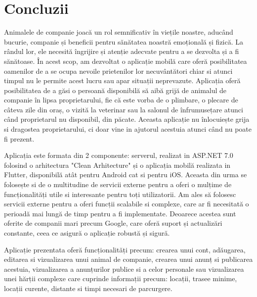 \chapter*{Concluzii} 

Animalele de companie joacă un rol semnificativ în viețile noastre, aducând bucurie, companie și beneficii pentru sănătatea noastră emoțională și fizică. La rândul lor, ele necesită îngrijire și atenție adecvate pentru a se dezvolta și a fi sănătoase. În acest scop, am dezvoltat o aplicație mobilă care oferă posibilitatea oamenilor de a se ocupa nevoile prietenilor lor necuvântători chiar si atunci timpul nu le permite acest lucru sau apar situații neprevazute. Aplicația oferă posibilitatea de a găsi o persoană disponibilă să aibă grijă de animalul de companie în lipsa proprietarului, fie că este vorba de o plimbare, o plecare de câteva zile din oraș, o vizită la veterinar sau la salonul de înfrumusețare atunci când proprietarul nu disponibil, din păcate. Aceasta aplicație nu înlocuiește grija si dragostea proprietarului, ci doar vine in ajutorul acestuia atunci când nu poate fi prezent.

Aplicația este formata din 2 componente: serverul, realizat in ASP.NET 7.0 folosind o arhitectura "Clean Arhitecture" și o aplicația mobilă realizata in Flutter, disponibilă atât pentru Android cat si pentru iOS. Aceasta din urma se folosește si de o multitudine de servicii externe pentru a oferi o mulțime de funcționalități utile si interesante pentru toți utilizatorii. Am ales să folosesc servicii externe pentru a oferi funcții scalabile si complexe, care ar fi necesitată o perioadă mai lungă de timp pentru a fi implementate. Deoarece acestea sunt oferite de companii mari precum Google, care oferă suport și actualizări constante, ceea ce asigură o aplicație robustă și sigură.

Aplicație prezentata oferă funcționalități precum: crearea unui cont, adăugarea, editarea si vizualizarea unui animal de companie, crearea unui anunț si publicarea acestuia, vizualizarea a anunțurilor publice si a celor personale sau vizualizarea unei hărții complexe care cuprinde informații precum: locații, trasee minime, locații curente, distante si timpi necesari de parcurgere.

